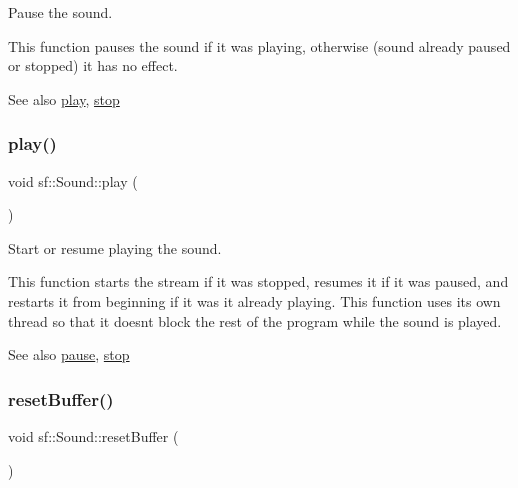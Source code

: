 Pause the sound. 

This function pauses the sound if it was playing, otherwise (sound already paused or stopped) it has no effect.

\begin{DoxySeeAlso}{See also}
\hyperlink{classsf_1_1_sound_a2953ffe632536e72e696fd880ced2532}{play}, \hyperlink{classsf_1_1_sound_aa9c91c34f7c6d344d5ee9b997511f754}{stop} 
\end{DoxySeeAlso}
\mbox{\label{classsf_1_1_sound_a2953ffe632536e72e696fd880ced2532}} 
\subsubsection{\texorpdfstring{play()}{play()}}
{\footnotesize\ttfamily void sf\+::\+Sound\+::play (\begin{DoxyParamCaption}{ }\end{DoxyParamCaption})}



Start or resume playing the sound. 

This function starts the stream if it was stopped, resumes it if it was paused, and restarts it from beginning if it was it already playing. This function uses its own thread so that it doesn\textquotesingle{}t block the rest of the program while the sound is played.

\begin{DoxySeeAlso}{See also}
\hyperlink{classsf_1_1_sound_a5eeb25815bfa8cdc4a6cc000b7b19ad5}{pause}, \hyperlink{classsf_1_1_sound_aa9c91c34f7c6d344d5ee9b997511f754}{stop} 
\end{DoxySeeAlso}
\mbox{\label{classsf_1_1_sound_acb7289d45e06fb76b8292ac84beb82a7}} 
\subsubsection{\texorpdfstring{reset\+Buffer()}{resetBuffer()}}
{\footnotesize\ttfamily void sf\+::\+Sound\+::reset\+Buffer (\begin{DoxyParamCaption}{ }\end{DoxyParamCaption})}



